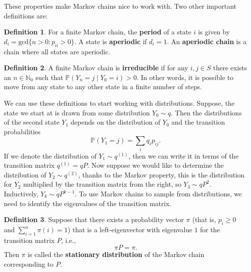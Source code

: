 \documentclass[
]{book}
\newtheorem{proposition}{Proposition}[chapter]
\theoremstyle{definition}
\newtheorem{definition}{Definition}[chapter]
\theoremstyle{definition}
\theoremstyle{definition}
\theoremstyle{definition}
\theoremstyle{remark}
\begin{document}
These  properties make Markov chains nice to work with. Two other important definitions are:

\begin{definition}
For a finite Markov chain, the \textbf{period }of a state \(i\) is given by \(d_i = \textrm{gcd}\{n > 0; p_{ii} > 0 \}\). A state is \textbf{aperiodic} if \(d_i = 1\). An \textbf{aperiodic chain} is a chain where all states are aperiodic.
\end{definition}

\begin{definition}
A finite Markov chain is \textbf{irreducible} if for any \(i,j \in S\) there exists an \(n \in \mathbb{N}_0\) such that \(\mathbb{P} (Y_n = j \mid Y_0 = i) > 0\). In other words, it is possible to move from any state to any other state in a finite number of steps.
\end{definition}

We can use these definitions to start working with distributions. Suppose, the state we start at is drawn from some distribution \(Y_0 \sim q\). Then the distributions of the second state \(Y_1\) depends on the distribution of \(Y_0\) and the transition probabilities
\[
\mathbb{P}(Y_1 = j) = \sum_i q_ip_{ij}.
\]
If we denote the distribution of \(Y_1 \sim {q}^{(1)}\), then we can write it in terms of the transition matrix \({q}^{(1)} = {q}P\). Now suppose we would like to determine the distribution of \(Y_2 \sim {q}^{(2)}\), thanks to the Markov property, this is the distribution for \(Y_2\) multiplied by the transition matrix from the right, so \(Y_3 \sim qP^2\). Inductively, \(Y_k \sim qP^{k-1}\). To use Markov chains to sample from distributions, we need to identify the eigenvalues of the transition matrix.



\begin{definition}
Suppose that there exists a probability vector \(\pi\) (that is, \(p_i \geq 0\) and  \(\sum_{i=1}^n \pi(i) = 1\))  that is a left-eigenvector with eigenvalue \(1\) for the transition matrix \(P\), i.e.,
\[
\pi P = \pi. 
\]
Then  \(\pi\) is called the \textbf{stationary distribution} of the Markov chain corresponding to \(P\).
\end{definition}
\end{document}
